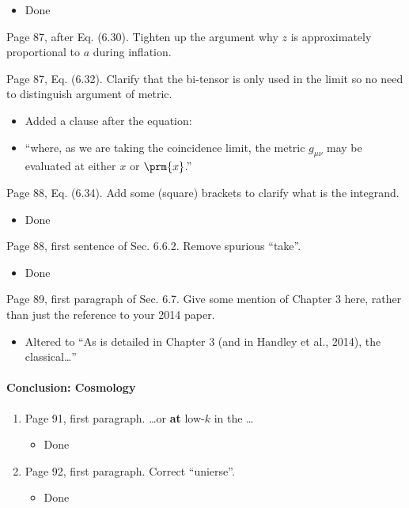 \documentclass[11pt]{article}
\newcommand{\todo}[1]{{\color{red} #1}}
\begin{document}
\begin{enumerate}
    \begin{itemize}
        \item Done
    \end{itemize}
    \todo{%
\item Page 87, after Eq. (6.30). Tighten up the argument why $z$ is
  approximately proportional to $a$ during inflation.
  }
\item Page 87, Eq. (6.32). Clarify that the bi-tensor is only used in
  the limit so no need to distinguish argument of metric.
  \begin{itemize}
      \item Added a clause after the equation:
        \item ``where, as we are taking the coincidence limit, the metric \(g_{\mu\nu}\) may be evaluated at either \(x\) or \(\prm{x}\).''
  \end{itemize}
\item Page 88, Eq. (6.34). Add some (square) brackets to clarify what
  is the integrand.
  \begin{itemize}
      \item Done
  \end{itemize}
\item Page 88,  first sentence of Sec. 6.6.2. Remove spurious
  ``take''.
  \begin{itemize}
      \item Done
  \end{itemize}
\item Page 89, first paragraph of Sec. 6.7. Give some mention of
  Chapter 3 here, rather than just the reference to your 2014 paper. 
  \begin{itemize}
      \item Altered to ``As is detailed in Chapter 3 (and in Handley et al., 2014), the classical\ldots''
  \end{itemize}
\end{enumerate}

\paragraph{Conclusion: Cosmology}
\begin{enumerate}
\item Page 91, first paragraph. \ldots or \textbf{at} low-$k$ in the
  \ldots
  \begin{itemize}
      \item Done
  \end{itemize}
\item Page 92, first paragraph. Correct ``unierse''.
    \begin{itemize}
        \item Done
    \end{itemize}
\end{enumerate}
\end{document}

